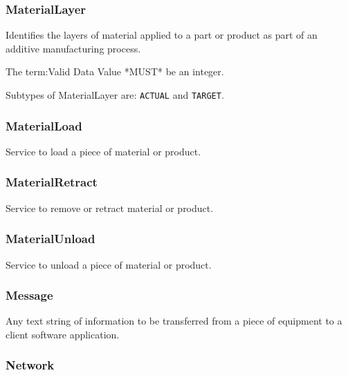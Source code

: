 \FloatBarrier

\subsubsection{MaterialLayer}
  \label{sec:MaterialLayer}


Identifies the layers of material applied to a part or product as part of an additive manufacturing process.
  
 The {term:Valid Data Value} *MUST* be an integer.


Subtypes of MaterialLayer are: \texttt{ACTUAL} and \texttt{TARGET}. 
\FloatBarrier

\subsubsection{MaterialLoad}
  \label{sec:MaterialLoad}


Service to load a piece of material or product.

\FloatBarrier

\subsubsection{MaterialRetract}
  \label{sec:MaterialRetract}


Service to remove or retract material or product.

\FloatBarrier

\subsubsection{MaterialUnload}
  \label{sec:MaterialUnload}


Service to unload a piece of material or product.

\FloatBarrier

\subsubsection{Message}
  \label{sec:Message}


Any text string of information to be transferred from a piece of equipment to a client software application.

\FloatBarrier

\subsubsection{Network}
  \label{sec:Network}



